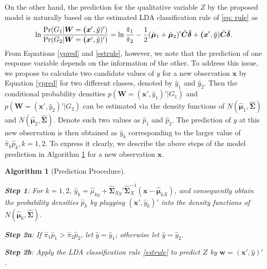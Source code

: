 \documentclass[12pt]{article}
\newtheorem{algorithm}{Algorithm}%
\begin{document}
On the other hand, the prediction for the qualitative variable $Z$ by the proposed model is naturally based on the estimated LDA classification rule of \eqref{eq: rule} as
\begin{equation}\label{estrule}
\ln\frac{\hbox{Pr}(G_1|\bm W=\bm (\bm x', \hat{y})')}{\hbox{Pr}(G_2|\bm W=\bm (\bm x', \hat{y})')}=\ln\frac{\hat{\pi}_1}{\hat{\pi}_2}-\frac{1}{2}(\hat{\bm \mu}_1+\hat{\bm \mu}_2)' \hat{\bm C} \hat{\bm \delta} + \bm (\bm x', \hat{y}) \hat{\bm C} \hat{\bm \delta}.
\end{equation}
From Equations \eqref{ypred} and \eqref{estrule}, however, we note that the prediction of one response variable depends on the information of the other.
To address this issue, we propose to calculate two candidate values of $y$ for a new observation $\bm x$ by Equation \eqref{ypred} for two different classes, denoted by $\hat{y}_1$ and $\hat{y}_2$.
Then the conditional probability densities $p(\bm W = (\bm x', \hat{y}_1)' | G_1 )$ and $p(\bm W = (\bm x', \hat{y}_2)' | G_2 )$ can be estimated via the density functions of $N(\hat{\bm \mu}_1, \hat{\bm \Sigma})$ and $N(\hat{\bm \mu}_2, \hat{\bm \Sigma})$.
Denote such two values as $\hat{p}_1$ and $\hat{p}_2$.
The prediction of $y$ at this new observation is then obtained as $\hat{y}_k$ corresponding to the larger value of $\hat{\pi}_{k} \hat{p}_k, k = 1, 2$.
To express it clearly, we describe the above steps of the model prediction in Algorithm \ref{alg2} for a new observation $\bm x$.

%
%
%
%
\begin{algorithm}[Prediction Procedure]\label{alg2}
\noindent

{\bf Step 1}: For $k = 1, 2$, $\hat{y}_k = \hat{\mu}_{ky} + \hat{\bm \Sigma}_{Xy}' \hat{\bm \Sigma}_{X}^{-1} (\bm x - \hat{\bm \mu}_{kX})$,
and consequently obtain the probability densities $\hat{p}_k$ by plugging $(\bm x', \hat{y}_k)'$ into the density functions of $N(\hat{\bm \mu}_k, \hat{\bm \Sigma})$.

{\bf Step 2a}: If $\hat{\pi}_1 \hat{p}_1 > \hat{\pi}_2 \hat{p}_2$, let $\hat{y} = \hat{y}_{1}$; otherwise let $\hat{y} = \hat{y}_{2}$.

{\bf Step 2b}: Apply the LDA classification rule \eqref{estrule} to predict $Z$ by $\bm w = (\bm x', \hat{y})'$.
\end{algorithm}
\end{document}
